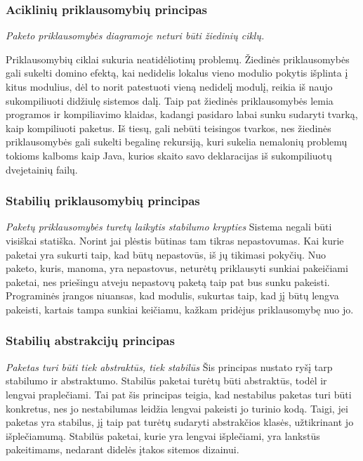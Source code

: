 \subsubsection{Aciklinių priklausomybių principas}
\textit{Paketo priklausomybės diagramoje neturi būti žiedinių ciklų.}

Priklausomybių ciklai sukuria neatidėliotinų problemų.
Žiedinės priklausomybės gali sukelti domino efektą, kai nedidelis lokalus vieno modulio pokytis išplinta į kitus modulius,
dėl to norit patestuoti vieną nedidelį modulį, reikia iš naujo sukompiliuoti didžiulę sistemos dalį.
Taip pat žiedinės priklausomybės lemia programos ir kompiliavimo klaidas, kadangi pasidaro labai sunku sudaryti tvarką, kaip kompiliuoti paketus.
Iš tiesų, gali nebūti teisingos tvarkos, nes žiedinės priklausomybės gali sukelti begalinę rekursiją,
kuri sukelia nemalonių problemų tokioms kalboms kaip Java, kurios skaito savo deklaracijas iš
sukompiliuotų dvejetainių failų\cite{AgileSoftwareDevelopment}.


\subsubsection{Stabilių priklausomybių principas}
\textit{Paketų priklausomybės turetų laikytis stabilumo krypties}
Sistema negali būti visiškai statiška.
Norint jai plėstis būtinas tam tikras nepastovumas.
Kai kurie paketai yra sukurti taip, kad būtų nepastovūs, iš jų tikimasi pokyčių.
Nuo paketo, kuris, manoma, yra nepastovus, neturėtų priklausyti sunkiai pakeičiami paketai,
nes priešingu atveju nepastovų paketą taip pat bus sunku pakeisti.
Programinės įrangos niuansas, kad modulis, sukurtas taip, kad jį būtų lengva pakeisti, kartais tampa sunkiai keičiamu, kažkam
 pridėjus priklausomybę nuo jo\cite{AgileSoftwareDevelopment}.


\subsubsection{Stabilių abstrakcijų principas}
\textit{Paketas turi būti tiek abstraktūs, tiek stabilūs}
Šis principas nustato ryšį tarp stabilumo ir abstraktumo.
Stabilūs paketai turėtų būti abstraktūs, todėl ir lengvai praplečiami.
Tai pat šis principas teigia, kad nestabilus paketas turi būti konkretus, nes jo nestabilumas leidžia lengvai pakeisti jo turinio kodą.
Taigi, jei paketas yra stabilus, jį taip pat turėtų sudaryti abstrakčios klasės, užtikrinant jo išplečiamumą.
Stabilūs paketai, kurie yra lengvai išplečiami, yra lankstūs pakeitimams, nedarant didelės įtakos sitemos dizainui\cite{AgileSoftwareDevelopment}.

